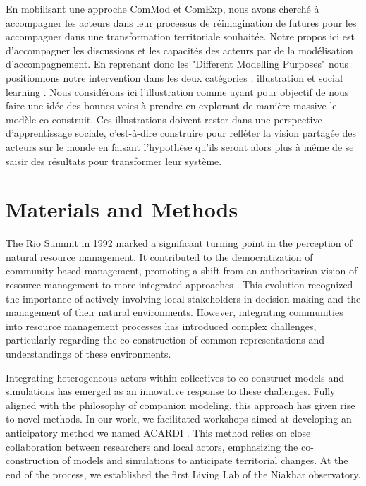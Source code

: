 \documentclass{article}
\begin{document}
En mobilisant une approche ComMod et ComExp, nous avons cherché à accompagner les acteurs dans leur processus de réimagination de futures \parencite{jansujwicz_localism_2021} pour les accompagner dans une transformation territoriale souhaitée. Notre propos ici est d'accompagner les discussions et les capacités des acteurs par de la modélisation d'accompagnement. En reprenant donc les "Different Modelling Purposes" \parencite{edmonds_different_2019} nous positionnons notre intervention dans les deux catégories : illustration et social learning \parencite{sukthankar_kilt_2017}. Nous considérons ici l'illustration comme ayant pour objectif de nous faire une idée des bonnes voies à prendre en explorant de manière massive le modèle co-construit. Ces illustrations doivent rester dans une perspective d'apprentissage sociale, c'est-à-dire construire pour refléter la vision partagée des acteurs sur le monde en faisant l'hypothèse qu'ils seront alors plus à même de se saisir des résultats pour transformer leur système.

\section{Materials and Methods}

The Rio Summit in 1992 marked a significant turning point in the perception of natural resource management. It contributed to the democratization of community-based management, promoting a shift from an authoritarian vision of resource management to more integrated approaches \parencite{delay_coming_2022}. This evolution recognized the importance of actively involving local stakeholders in decision-making and the management of their natural environments. However, integrating communities into resource management processes has introduced complex challenges, particularly regarding the co-construction of common representations and understandings of these environments.

Integrating heterogeneous actors within collectives to co-construct models and simulations has emerged as an innovative response to these challenges. Fully aligned with the philosophy of companion modeling, this approach has given rise to novel methods. In our work, we facilitated workshops aimed at developing an anticipatory method we named ACARDI \parencite{perrotton_definition_2021}. This method relies on close collaboration between researchers and local actors, emphasizing the co-construction of models and simulations to anticipate territorial changes. At the end of the process, we established the first Living Lab of the Niakhar observatory.
\end{document}
